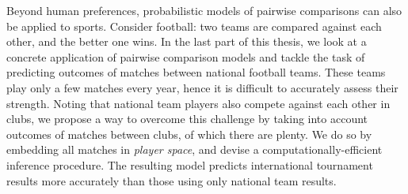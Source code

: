 Beyond human preferences, probabilistic models of pairwise comparisons can also be applied to sports.
Consider football: two teams are compared against each other, and the better one wins.
In the last part of this thesis, we look at a concrete application of pairwise comparison models and tackle the task of predicting outcomes of matches between national football teams.
These teams play only a few matches every year, hence it is difficult to accurately assess their strength.
Noting that national team players also compete against each other in clubs, we propose a way to overcome this challenge by taking into account outcomes of matches between clubs, of which there are plenty.
We do so by embedding all matches in \emph{player space}, and devise a computationally-efficient inference procedure.
The resulting model predicts international tournament results more accurately than those using only national team results.


\cleardoublepage

